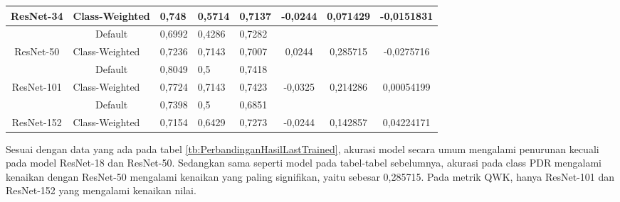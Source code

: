 \begin{table}[hbtp]
\begin{center}
\begin{tabular}{|c|c|lll|ccc|}
		\multirow{-2}{*}{ResNet-34}                          & \multicolumn{1}{l|}{Class-Weighted}                       & \multicolumn{1}{l|}{0,748}   & \multicolumn{1}{l|}{0,5714} & 0,7137                   & \multicolumn{1}{c|}{\multirow{-2}{*}{-0,0244}} & \multicolumn{1}{c|}{\multirow{-2}{*}{0,071429}} & \multirow{-2}{*}{-0,0151831} \\ \hline
															 & Default                                                   & \multicolumn{1}{l|}{0,6992}  & \multicolumn{1}{l|}{0,4286} & 0,7282                   & \multicolumn{1}{c|}{}                          & \multicolumn{1}{c|}{}                           &                              \\ \cline{2-5}
		\multirow{-2}{*}{ResNet-50}                          & \multicolumn{1}{l|}{Class-Weighted}                       & \multicolumn{1}{l|}{0,7236}  & \multicolumn{1}{l|}{0,7143} & 0,7007                   & \multicolumn{1}{c|}{\multirow{-2}{*}{0,0244}}  & \multicolumn{1}{c|}{\multirow{-2}{*}{0,285715}} & \multirow{-2}{*}{-0,0275716} \\ \hline
															 & Default                                                   & \multicolumn{1}{l|}{0,8049}  & \multicolumn{1}{l|}{0,5}    & 0,7418                   & \multicolumn{1}{c|}{}                          & \multicolumn{1}{c|}{}                           &                              \\ \cline{2-5}
		\multirow{-2}{*}{ResNet-101}                         & \multicolumn{1}{l|}{Class-Weighted}                       & \multicolumn{1}{l|}{0,7724}  & \multicolumn{1}{l|}{0,7143} & 0,7423                   & \multicolumn{1}{c|}{\multirow{-2}{*}{-0,0325}} & \multicolumn{1}{c|}{\multirow{-2}{*}{0,214286}} & \multirow{-2}{*}{0,00054199} \\ \hline
															 & Default                                                   & \multicolumn{1}{l|}{0,7398}  & \multicolumn{1}{l|}{0,5}    & 0,6851                   & \multicolumn{1}{c|}{}                          & \multicolumn{1}{c|}{}                           &                              \\ \cline{2-5}
		\multirow{-2}{*}{ResNet-152}                         & \multicolumn{1}{l|}{Class-Weighted}                       & \multicolumn{1}{l|}{0,7154}  & \multicolumn{1}{l|}{0,6429} & 0,7273                   & \multicolumn{1}{c|}{\multirow{-2}{*}{-0,0244}} & \multicolumn{1}{c|}{\multirow{-2}{*}{0,142857}} & \multirow{-2}{*}{0,04224171} \\ \hline
	\end{tabular}
\end{center}
\end{table}

Sesuai dengan data yang ada pada tabel \ref{tb:PerbandinganHasilLastTrained}, akurasi model secara umum mengalami penurunan kecuali pada model ResNet-18 dan ResNet-50. Sedangkan sama seperti model pada tabel-tabel sebelumnya, akurasi pada class PDR mengalami kenaikan dengan ResNet-50 mengalami kenaikan yang paling signifikan, yaitu sebesar 0,285715. Pada metrik QWK, hanya ResNet-101 dan ResNet-152 yang mengalami kenaikan nilai.